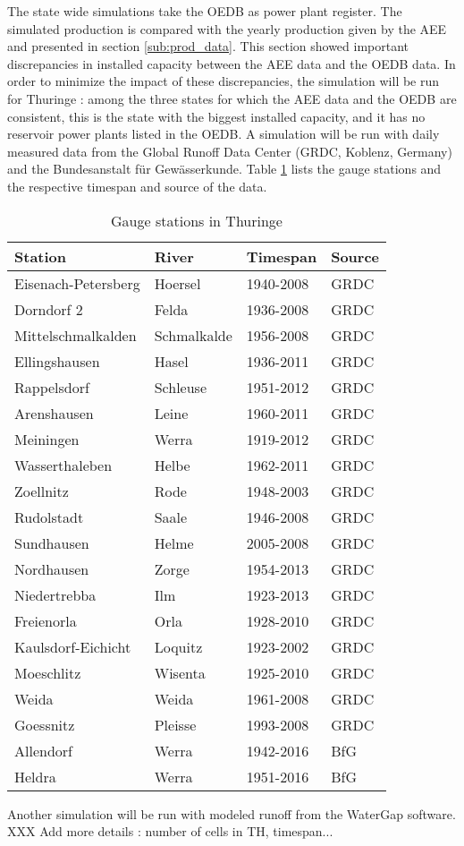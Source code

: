 The state wide simulations take the OEDB as power plant register. The simulated production is compared with the yearly production given by the AEE and presented in section \ref{sub:prod_data}. This section showed important discrepancies in installed capacity between the AEE data and the OEDB data. In order to minimize the impact of these discrepancies, the simulation will be run for Thuringe : among the three states for which the AEE data and the OEDB are consistent, this is the state with the biggest installed capacity, and it has no reservoir power plants listed in the OEDB. \newline
A simulation will be run with daily measured data from the Global Runoff Data Center (GRDC, Koblenz, Germany) and the Bundesanstalt für Gewässerkunde. Table \ref{quelle_runoff_th} lists the gauge stations and the respective timespan and source of the data.
\begin{table}
\footnotesize
 \centering
 \caption{Gauge stations in Thuringe}
 \label{quelle_runoff_th}
 \begin{tabular}{|l|l|l|l|}
  \hline
  \textbf{Station}&\textbf{River}&\textbf{Timespan}&\textbf{Source}\\
  \hline
  Eisenach-Petersberg&Hoersel&1940-2008&GRDC\\
  Dorndorf 2&Felda&1936-2008&GRDC\\
  Mittelschmalkalden&Schmalkalde&1956-2008&GRDC\\
  Ellingshausen&Hasel&1936-2011&GRDC\\
  Rappelsdorf&Schleuse&1951-2012&GRDC\\
  Arenshausen&Leine&1960-2011&GRDC\\
  Meiningen&Werra&1919-2012&GRDC\\
  Wasserthaleben&Helbe&1962-2011&GRDC\\
  Zoellnitz&Rode&1948-2003&GRDC\\
  Rudolstadt&Saale&1946-2008&GRDC\\
  Sundhausen&Helme&2005-2008&GRDC\\
  Nordhausen&Zorge&1954-2013&GRDC\\
  Niedertrebba&Ilm&1923-2013&GRDC\\
  Freienorla&Orla&1928-2010&GRDC\\
  Kaulsdorf-Eichicht&Loquitz&1923-2002&GRDC\\
  Moeschlitz&Wisenta&1925-2010&GRDC\\
  Weida&Weida&1961-2008&GRDC\\
  Goessnitz&Pleisse&1993-2008&GRDC\\
  Allendorf&Werra&1942-2016&BfG\\
  Heldra&Werra&1951-2016&BfG\\
  \hline
 \end{tabular}
\end{table}

Another simulation will be run with modeled runoff from the WaterGap software. XXX Add more details : number of cells in TH, timespan... 
